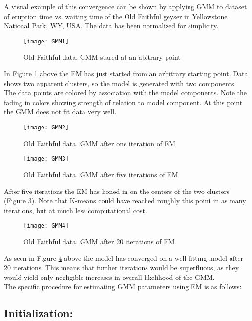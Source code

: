 A visual example of this convergence can be shown by applying GMM to dataset of eruption time vs. waiting time of the Old Faithful geyser in Yellowstone National Park, WY, USA.
The data has been normalized for simplicity. 
\\

\begin{figure}[H]
\centering
\texttt{[image: GMM1]}
\caption{Old Faithful data. GMM stared at an abitrary point}
\label{fig:GMM1}
\end{figure}

In Figure \ref{fig:GMM1} above the EM has just started from an arbitrary starting point.
Data shows two apparent clusters, so the model is generated with two components.
The data points are colored by association with the model components.
Note the fading in colors showing strength of relation to model component.
At this point the GMM does not fit data very well.

\begin{figure}[H]
\centering
\texttt{[image: GMM2]}
\caption{Old Faithful data. GMM after one iteration of EM}
\label{fig:GMM2}
\end{figure}

\begin{figure}[H]
\centering
\texttt{[image: GMM3]}
\caption{Old Faithful data. GMM after five iterations of EM}
\label{fig:GMM3}
\end{figure}

After five iterations the EM has honed in on the centers of the two clusters (Figure \ref{fig:GMM3}).
Note that K-means could have reached roughly this point in as many iterations, but at much less computational cost.

\begin{figure}[H]
\centering
\texttt{[image: GMM4]}
\caption{Old Faithful data. GMM after 20 iterations of EM}
\label{fig:GMM4}
\end{figure}

As seen in Figure \ref{fig:GMM4} above the model has converged on a well-fitting model after 20 iterations.
This means that further iterations would be superfluous, as they would yield only negligible increases in overall likelihood of the GMM. \\

The specific procedure for estimating GMM parameters using EM is as follows: %

\subsection*{Initialization:}

